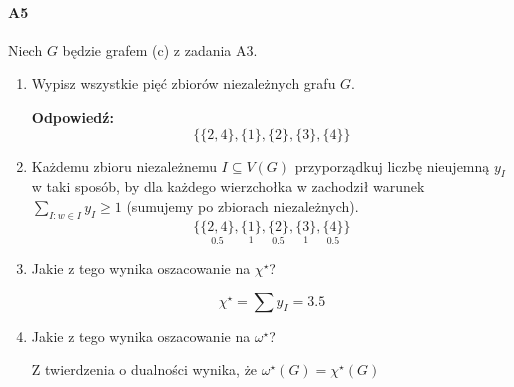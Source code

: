 \documentclass[a4paper,12pt]{article}
\theoremstyle{definition}%
\theoremstyle{definition}
\theoremstyle{problem}
\begin{document}
\paragraph{A5} Niech $G$ będzie grafem (c) z zadania A3.
\begin{enumerate}[label=\alph*)]
\item Wypisz wszystkie pięć zbiorów niezależnych grafu $G$.

\textbf{Odpowiedź:}
$$\{\{2,4\},\{1\},\{2\},\{3\},\{4\}\}$$
\item Każdemu zbioru niezależnemu $I \subseteq V(G)$ przyporządkuj liczbę nieujemną $y_I$ w taki sposób, by dla każdego wierzchołka w zachodził warunek $\sum _{I:w \in I}y_I \geq 1$ (sumujemy po zbiorach niezależnych).
$$\{\underset{0.5}{\{2,4\}},\underset{1}{\{1\}},\underset{0.5}{\{2\}},\underset{1}{\{3\}},\underset{0.5}{\{4\}}\}$$
\item Jakie z tego wynika oszacowanie na $\chi ^\star$?

$$\chi ^\star = \sum y_I=3.5$$
\item Jakie z tego wynika oszacowanie na $\omega ^\star$?

Z twierdzenia o dualności wynika, że $\omega ^\star (G) = \chi ^\star (G)$
\end{enumerate}
\end{document}
